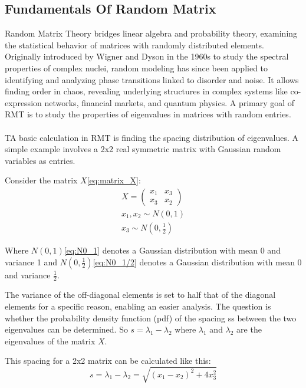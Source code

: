 \subsection{Fundamentals Of Random Matrix}\label{subsec:fundamentals-of-random-matrix}

Random Matrix Theory bridges linear algebra and probability theory\cite{vivo_random_2017}, examining the statistical behavior of matrices with randomly distributed elements.
Originally introduced by Wigner and Dyson in the 1960s to study the spectral properties of complex nuclei, random modeling has since been applied to identifying and analyzing phase transitions linked to disorder and noise\cite{deng_molecular_2012}.
It allows finding order in chaos, revealing underlying structures in complex systems like co-expression networks\cite{luo_constructing_2007}, financial markets\cite{pharasi_complex_2018}, and quantum physics\cite{guhr_random_1997}.
A primary goal of RMT is to study the properties of eigenvalues in matrices with random entries.
\\\\
\noindent TA basic calculation in RMT is finding the spacing distribution of eigenvalues.
A simple example involves a 2x2 real symmetric matrix with Gaussian random variables as entries.

\noindent Consider the matrix $X$\eqref{eq:matrix_X}:
\begin{align}
\label{eq:matrix_X}
X=\begin{pmatrix}
x_1 & x_3\\ x_3 & x_2
\end{pmatrix}\\
\label{eq:N0_1}
x_1, x_2 \sim N(0,1)\\
\label{eq:N0_1/2}
x_3 \sim N(0,\frac{1}{2})
\end{align}


\noindent Where $N(0,1)$\eqref{eq:N0_1} denotes a Gaussian distribution with mean 0 and variance 1 and $N(0,\frac{1}{2})$\eqref{eq:N0_1/2} denotes a Gaussian distribution with mean 0 and variance $\frac{1}{2}$.

The variance of the off-diagonal elements is set to half that of the diagonal elements for a specific reason, enabling an easier analysis.
The question is whether the probability density function (pdf) of the spacing ss between the two eigenvalues can be determined.
So $s=\lambda_1-\lambda_2$ where $\lambda_1$ and $\lambda_2$ are the eigenvalues of the matrix $X$.

\noindent This spacing for a 2x2 matrix can be calculated like this:
\[s = \lambda_1 - \lambda_2 = \sqrt{(x_1 - x_2)^2 + 4x_3^2}\]

